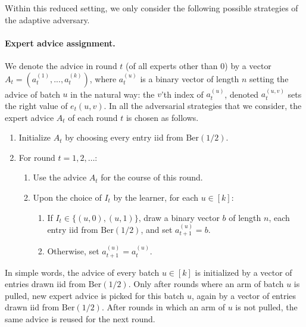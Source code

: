\documentclass[a4paper,11pt]{article}
\theoremstyle{definition}
\newcommand{\Ber}{\mathrm{Ber}}
\begin{document}
Within this reduced setting, we only consider the following possible strategies of the adaptive adversary.
\paragraph{Expert advice assignment.}
We denote the advice in round $t$ (of all experts other than $0$) by a vector $A_t = (a_t^{(1)},...,a_t^{(k)})$, where $a_t^{(u)}$ is a binary vector of length $n$ setting the advice of batch $u$ in the natural way: the $v$'th index of $a_t^{(u)}$, denoted $a_t^{(u,v)}$ sets the right value of $e_t(u,v)$. In all the adversarial strategies that we consider, the expert advice $A_t$ of each round $t$ is chosen as follows.

\begin{enumerate}
    \item Initialize $A_t$ by choosing every entry iid from $\Ber(1/2)$.
    \item For round $t = 1,2, \ldots$:
    \begin{enumerate}
        \item Use the advice $A_t$ for the course of this round. 
        \item Upon the choice of $I_t$ by the learner, for each $u \in [k]$:
        \begin{enumerate}
            \item If $I_t \in \{(u,0),(u,1)\}$, draw a binary vector $b$ of length $n$, each entry iid from $\Ber(1/2)$, and set $a_{t+1}^{(u)} = b$.
            \item Otherwise, set $a_{t+1}^{(u)} = a_{t}^{(u)}$.
        \end{enumerate}
    \end{enumerate}
\end{enumerate}

In simple words, the advice of every batch $u \in [k]$ is initialized by a vector of entries drawn iid from $\Ber(1/2)$. Only after rounds where an arm of batch $u$ is pulled, new expert advice is picked for this batch $u$, again by a vector of entries drawn iid from $\Ber(1/2)$. After rounds in which an arm of $u$ is not pulled, the same advice is reused for the next round.
\end{document}
